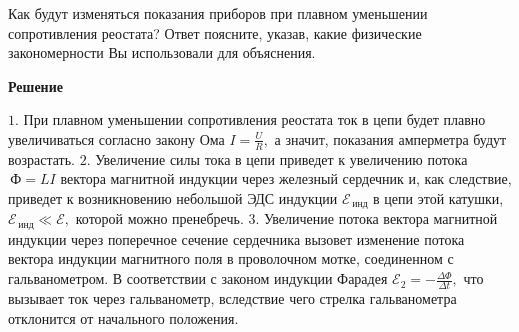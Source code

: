 \documentclass[12pt,a4paper]{article}
\begin{document}
{Как будут изменяться показания приборов при плавном уменьшении сопротивления реостата? Ответ поясните, указав, какие физические закономерности Вы использовали для объяснения.
}{
\smallskip\noindent\textbf{Решение}\par
$1$.  При плавном уменьшении сопротивления реостата ток в цепи будет плавно увеличиваться согласно закону Ома $I= \frac{U}{R} ,$ а значит, показания амперметра будут возрастать.
$2$.  Увеличение силы тока в цепи приведет к увеличению потока $\,\text{Ф}=LI$ вектора магнитной индукции через железный сердечник и, как следствие, приведет к возникновению небольшой ЭДС индукции $\mathcal E_{\,\text{инд}}$ в цепи этой катушки, $\mathcal E_{\,\text{инд}}\ll\mathcal E ,$ которой можно пренебречь.
$3$.  Увеличение потока вектора магнитной индукции через поперечное сечение сердечника вызовет изменение потока вектора индукции магнитного поля в проволочном мотке, соединенном с гальванометром. В соответствии с законом индукции Фарадея $\mathcal E_2= - \frac{\Delta \Phi}{\Delta t} ,$ что вызывает ток через гальванометр, вследствие чего стрелка гальванометра отклонится от начального положения.
}
\end{document}
